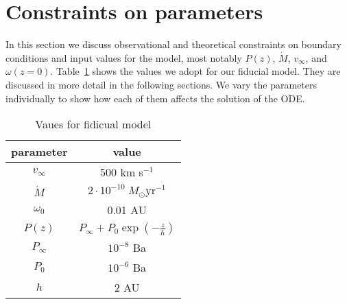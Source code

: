 \section{Constraints on parameters}
\label{sect:parameters}
In this section we discuss observational and theoretical constraints on boundary conditions and input values for the model, most notably $P(z)$, $\dot M$, $v_\infty$, and $\omega(z=0)$. Table~\ref{tab:fiducial} shows the values we adopt for our fiducial model. They are discussed in more detail in the following sections. We vary the parameters individually to show how each of them affects the solution of the ODE. 
\begin{table}
\label{tab:fiducial}
\caption{Vaues for fidicual model}
\begin{tabular}{cc}
\hline\hline
parameter & value\\
\hline
$v_\infty$ & 500 km s$^{-1}$\\
$\dot M$ & $2\cdot10^{-10}\;M_\odot\textrm{yr}^{-1}$\\
$\omega_0$ & 0.01 AU\\
$P(z)$ & $P_\infty+P_0\exp\left(-\frac{z}{h}\right)$\\
$P_\infty$ & $10^{-8}$ Ba\\
$P_0$ & $10^{-6}$ Ba\\
$h$ & 2 AU\\
\hline
\end{tabular}
\end{table}